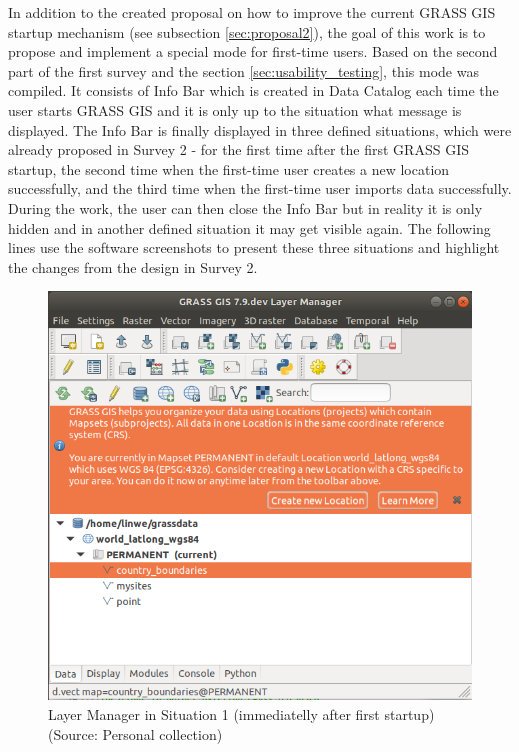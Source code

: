 \documentclass[a4paper,10pt,twoside]{article}
\begin{document}
\noindent In addition to the created proposal on how to improve the
current GRASS GIS startup mechanism (see subsection
\ref{sec:proposal2}), the goal of this work is to propose and
implement a special mode for first-time users. Based on the second
part of the first survey and the section \ref{sec:usability_testing},
this mode was compiled. It consists of Info Bar which is created in
Data Catalog each time the user starts GRASS GIS and it is only up to
the situation what message is displayed. The Info Bar is finally
displayed in three defined situations, which were already proposed in
Survey 2 - for the first time after the first GRASS GIS startup, the
second time when the first-time user creates a new location
successfully, and the third time when the first-time user imports data
successfully. During the work, the user can then close the Info Bar
but in reality it is only hidden and in another defined situation it
may get visible again. The following lines use the software
screenshots to present these three situations and highlight the
changes from the design in Survey 2.

\vspace{0.3cm}
\begin{figure}[hbt!] 
\begin{center}
\includegraphics[width=12cm]{../pictures/lmgr1.png} 
\caption[Layer Manager in Situation 1 (immediatelly after first startup)]{Layer Manager in Situation 1 (immediatelly after first startup) (Source: Personal collection)}
\label{fig:lmgr1}
\end{center}
\end{figure}
\end{document}
